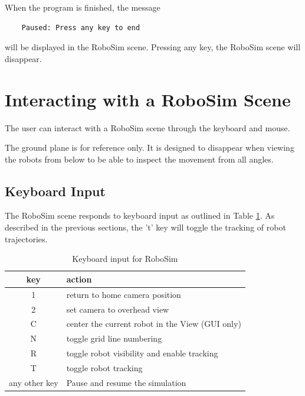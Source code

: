 \documentclass{article}
\begin{document}
When the program is finished, the message
\begin{verbatim}
    Paused: Press any key to end
\end{verbatim}
will be displayed in the RoboSim scene.  Pressing any key, the RoboSim scene
will disappear.

%
%
\section{Interacting with a RoboSim Scene}
The user can interact with a RoboSim scene through the keyboard and mouse.

The ground plane is for reference only.  It is designed to disappear when
viewing the robots from below to be able to inspect the movement from all
angles.

\subsection{Keyboard Input}
The RoboSim scene responds to keyboard input as outlined in Table
\ref{tab:keys}.  As described in the previous sections, the 't' key will toggle
the tracking of robot trajectories.

\begin{table}[H]
	\begin{center}
	\begin{tabular}{c | l }
		\hline \hline
		\textbf{key} & \textbf{action} \\ \hline
		1 & return to home camera position \\
		2 & set camera to overhead view \\
		C & center the current robot in the View (GUI only) \\
		N & toggle grid line numbering \\
		R & toggle robot visibility and enable tracking \\
		T & toggle robot tracking \\
		any other key & Pause and resume the simulation \\
		\hline \hline
	\end{tabular}
	\caption{Keyboard input for RoboSim}
	\label{tab:keys}
	\end{center}
\end{table}
\end{document}
